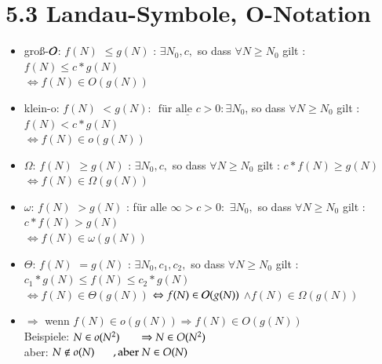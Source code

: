 \section*{5.3 Landau-Symbole, O-Notation}
\begin{itemize}[label={}]
    \item groß-$\mathcal{O}{}$: \hspace*{5mm}$f(N)$ \glqq $\leq$\grqq $g(N)$ : $\exists N_0, c, $ so dass $\forall N \geq N_0$ gilt : $f(N) \leq c * g(N)$\\
    \hspace*{4.5cm}$\Leftrightarrow f(N) \in O(g(N))$

    \item klein-o:  \hspace*{5mm}$f(N)$ \glqq $<$\grqq $g(N) $: $\underline{\text{ für alle } c>0} : \exists N_0 $, so dass $\forall N \geq N_0$ gilt : $f(N) < c * g(N)$\\
    \hspace*{4.5cm}$\Leftrightarrow f(N) \in o(g(N))$

    \item $\Omega$:  \hspace*{5mm}$f(N)$ \glqq $\geq$\grqq $g(N)$ : $\exists N_0, c, $ so dass $\forall N \geq N_0$ gilt : $c *f(N) \geq  g(N)$\\
    \hspace*{4.5cm}$\Leftrightarrow f(N) \in \Omega (g(N))$

    \item $\omega$:  \hspace*{5mm}$f(N)$ \glqq $>$\grqq $g(N)$ : für alle $\infty > c > 0:$ $\exists N_0, $ so dass $\forall N \geq N_0$ gilt : $c* f(N) > g(N)$\\
    \hspace*{4.5cm}$\Leftrightarrow f(N) \in \omega (g(N))$

    \item $\Theta$:  \hspace*{5mm}$f(N)$ \glqq $=$\grqq $g(N)$ : $\exists N_0, c_1, c_2, $ so dass $\forall N \geq N_0$ gilt : $c_1 * g(N) \leq f(N) \leq c_2 * g(N) $\\
    \hspace*{4.5cm}$\Leftrightarrow f(N) \in \Theta (g(N))$ $\Leftrightarrow f(N) \in \mathcal{O}{} (g(N))$ $\land f(N) \in \Omega (g(N))$

    \item $\Rightarrow$ wenn  $f(N) \in o(g(N)) \Rightarrow f(N) \in O(g(N))$ \\
    Beispiele: $N \in o(N^2) \hspace*{0.6cm} \Rightarrow N \in O(N^2)$ \\
    \hspace*{0.65cm} aber: $N \not\in o(N) \hspace*{0.6cm} , \text{aber }N \in O(N)$\\
\end{itemize}

